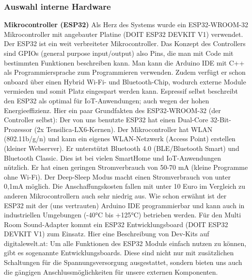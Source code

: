 \documentclass[11pt, twoside]{article}
\begin{document}
\subsubsection{Auswahl interne Hardware}
\textbf{Mikrocontroller (ESP32)}\newline
Als Herz des Systems wurde ein ESP32-WROOM-32 Mikrocontroller mit angebauter Platine (DOIT ESP32 DEVKIT V1) verwendet. Der ESP32 ist ein weit verbreiteter Mikrocontroller. Das Konzept des Controllers sind GPIOs (general purpose input/output) also Pins, die man mit Code mit bestimmten Funktionen beschreiben kann. Man kann die Arduino IDE mit C++ als Programmiersprache zum Programmieren verwenden. Zudem verfügt er schon onboard über einen Hybrid Wi-Fi- und Bluetooth-Chip, wodurch externe Module vermieden und somit Platz eingespart werden kann. Espressif selbst beschreibt den ESP32 als optimal für IoT-Anwendungen; auch wegen der hohen Energieeffizienz.\newline
Hier ein paar Grundfakten des ESP32-WROOM-32 (der Controller selbst):\newline
Der von uns benutzte ESP32 hat einen Dual-Core 32-Bit-Prozessor (2x Tensilica-LX6-Kernen). Der Mikrocontroller hat WLAN (802.11b/g/n) und kann ein eigenes WLAN-Netzwerk (Access Point) erstellen (kleiner Webserver). Er unterstützt Bluetooth 4.0 (BLE/Bluetooth Smart) und Bluetooth Classic. Dies ist bei vielen SmartHome und IoT-Anwendungen nützlich. Er hat einen geringen Stromverbrauch von 50-70 mA (kleine Programme ohne Wi-Fi). Der Deep-Sleep Modus macht einen Stromverbrauch von unter 0,1mA möglich. Die Anschaffungskosten fallen mit unter 10 Euro im Vergleich zu anderen Mikrocontrollern auch sehr niedrig aus.\newline
Wie schon erwähnt ist der ESP32 mit der (uns vertrauten) Arduino IDE programmierbar und kann auch in industriellen Umgebungen (-40°C bis +125°C) betrieben werden.\newline
Für den Multi Room Sound-Adapter kommt ein ESP32 Entwicklungsboard (DOIT ESP32 DEVKIT V1) zum Einsatz.\newline
Hier eine Beschreibung von Dev-Kits auf digitalewelt.at: \glqq Um alle Funktionen des ESP32 Moduls einfach nutzen zu können, gibt es sogenannte Entwicklungsboards. Diese sind nicht nur mit zusätzlichen Schaltungen für die Spannungsversorgung ausgestattet, sondern bieten uns auch die gängigen Anschlussmöglichkeiten für unsere externen Komponenten.\grqq{} \parencite{noauthor_urlnl07_nodate}\newline \newline
\end{document}
